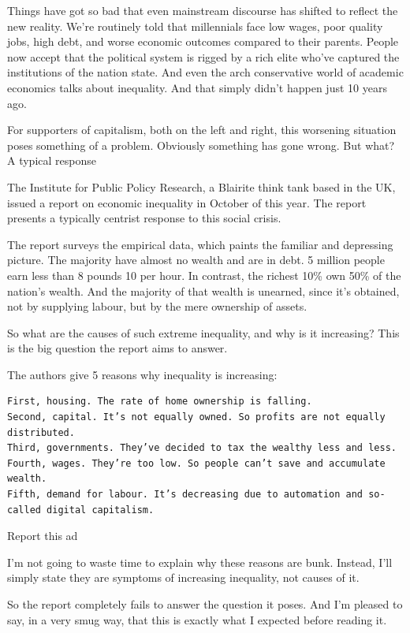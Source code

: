 \documentclass[
]{book}
\begin{document}
Things have got so bad that even mainstream discourse has shifted to reflect the new reality. We're routinely told that millennials face low wages, poor quality jobs, high debt, and worse economic outcomes compared to their parents. People now accept that the political system is rigged by a rich elite who've captured the institutions of the nation state. And even the arch conservative world of academic economics talks about inequality. And that simply didn't happen just 10 years ago.

For supporters of capitalism, both on the left and right, this worsening situation poses something of a problem. Obviously something has gone wrong. But what?
A typical response

The Institute for Public Policy Research, a Blairite think tank based in the UK, issued a report on economic inequality in October of this year. The report presents a typically centrist response to this social crisis.

The report surveys the empirical data, which paints the familiar and depressing picture. The majority have almost no wealth and are in debt. 5 million people earn less than 8 pounds 10 per hour. In contrast, the richest 10\% own 50\% of the nation's wealth. And the majority of that wealth is unearned, since it's obtained, not by supplying labour, but by the mere ownership of assets.

So what are the causes of such extreme inequality, and why is it increasing? This is the big question the report aims to answer.

The authors give 5 reasons why inequality is increasing:

\begin{verbatim}
First, housing. The rate of home ownership is falling.
Second, capital. It’s not equally owned. So profits are not equally distributed.
Third, governments. They’ve decided to tax the wealthy less and less.
Fourth, wages. They’re too low. So people can’t save and accumulate wealth.
Fifth, demand for labour. It’s decreasing due to automation and so-called digital capitalism.
\end{verbatim}

Report this ad

I'm not going to waste time to explain why these reasons are bunk. Instead, I'll simply state they are symptoms of increasing inequality, not causes of it.

So the report completely fails to answer the question it poses. And I'm pleased to say, in a very smug way, that this is exactly what I expected before reading it.
\end{document}
